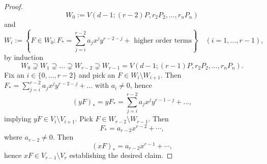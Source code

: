 \begin{proof}
        $$W_0 := V(d-1; (r-2)P,r_2P_2,\dots,r_nP_n)$$
        and 
        $$W_i := \left\{F\in W_0 : F_\ast = \sum_{j=i}^{r-2} a_jx^jy^{r-2-j}+\text{ higher order terms}\right\}\quad (i=1,\dots,r-1),$$
        by induction 
        $$W_0\supsetneq W_1\supsetneq \dots \supsetneq W_{r-2}\supsetneq W_{r-1}= V(d-1; (r-1)P,r_2P_2,\dots,r_nP_n).$$
        Fix an $i\in\{0,\dots,r-2\}$ and pick an $F\in W_i\setminus W_{i+1}$. Then $F_\ast = \sum_{j=i}^{r-2} a_jx^jy^{r-2-j}+\dots$ with $a_i\neq 0$, hence 
        $$(yF)_\ast = yF_\ast = \sum_{j=i}^{r-2} a_jx^jy^{r-1-j}+\dots, $$
        implying $yF\in V_i\setminus V_{i+1}$. Pick $F\in W_{r-2}\setminus W_{r-1}$. Then 
        $$F_\ast = a_{r-2}x^{r-2}+\cdots,$$
        where $a_{r-2}\neq 0$. Then 
        $$(xF)_\ast=a_{r-2}x^{r-1}+\cdots,$$
        hence $xF\in V_{r-1}\setminus V_r$ establishing the desired claim. 
    \end{proof}
